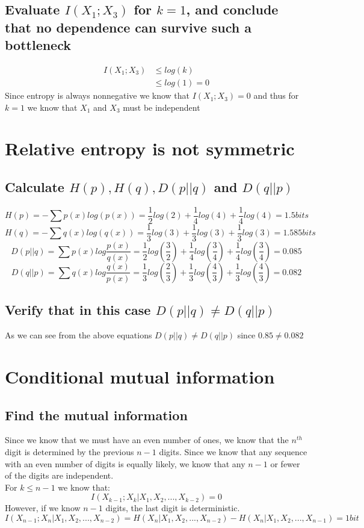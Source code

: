 \documentclass[11pt, oneside]{book}   	%
\begin{document}
\subsection{Evaluate $I(X_1;X_3)$ for $k=1$, and conclude that no dependence can survive such a bottleneck}

\begin{equation}
\begin{split}
I(X_1;X_3) & \leq log(k)\\
& \leq log(1) = 0
\end{split}
\end{equation}
Since entropy is always nonnegative we know that $I(X_1;X_3)=0$ and thus for $k=1$ we know that $X_1$ and $X_3$ must be independent

\section{Relative entropy is not symmetric}
\subsection{Calculate $H(p), H(q), D(p||q)$ and $D(q||p)$}

$$H(p) = -\sum p(x)log(p(x))=\frac{1}{2}log(2)+\frac{1}{4}log(4)+\frac{1}{4}log(4) = 1.5 bits$$
$$H(q) = -\sum q(x)log(q(x))=\frac{1}{3}log(3)+\frac{1}{3}log(3)+\frac{1}{3}log(3) = 1.585 bits$$
$$D(p||q) = \sum p(x)log\frac{p(x)}{q(x)}=\frac{1}{2}log(\frac{3}{2})+\frac{1}{4}log(\frac{3}{4})+\frac{1}{4}log(\frac{3}{4})=0.085$$
$$D(q||p) = \sum q(x)log\frac{q(x)}{p(x)}=\frac{1}{3}log(\frac{2}{3})+\frac{1}{3}log(\frac{4}{3})+\frac{1}{3}log(\frac{4}{3})=0.082$$

\subsection{Verify that in this case $D(p||q) \neq D(q||p)$}

As we can see from the above equations $D(p||q) \neq D(q||p)$ since $0.85 \neq 0.082$

\section{Conditional mutual information}
\subsection{Find the mutual information}
Since we know that we must have an even number of ones, we know that the $n^{th}$ digit is determined by the previous $n-1$ digits.  Since we know that any sequence with an even number of digits is equally likely, we know that any $n-1$ or fewer of the digits are independent.  
\\For $k \leq n-1$ we know that:
$$I(X_{k-1};X_k|X_1, X_2,...,X_{k-2}) = 0$$
However, if we know $n-1$ digits, the last digit is deterministic.
$$I(X_{n-1};X_n|X_1, X_2, ..., X_{n-2}) = H(X_n|X_1,X_2,...,X_{n-2}) - H(X_n|X_1,X_2,...,X_{n-1})=1bit$$
\end{document}

